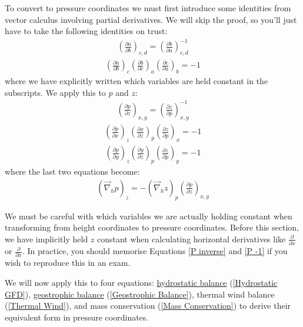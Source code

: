 To convert to pressure coordinates we must first introduce some identities from vector calculus involving partial derivatives. We will skip the proof, so you'll just have to take the following identities on trust:
\begin{align*}
    \left(\frac{\partial a}{\partial b}\right)_{c,d}=\left(\frac{\partial b}{\partial a}\right)_{c,d}^{-1}
\end{align*}
\begin{align*}
    \left(\frac{\partial a}{\partial b}\right)_c
    \left(\frac{\partial b}{\partial c}\right)_a
    \left(\frac{\partial c}{\partial a}\right)_b
    =-1
\end{align*}
where we have explicitly written which variables are held constant in the subscripts. We apply this to $p$ and $z$:
\begin{align}
    \label{P inverse}
    \left(\frac{\partial p}{\partial z}\right)_{x,y}=\left(\frac{\partial z}{\partial p}\right)_{x,y}^{-1}
\end{align}
\begin{align*}
    \left(\frac{\partial p}{\partial x}\right)_z
    \left(\frac{\partial x}{\partial z}\right)_p
    \left(\frac{\partial z}{\partial p}\right)_x
    =-1
\end{align*}
\begin{align*}
    \left(\frac{\partial p}{\partial y}\right)_z
    \left(\frac{\partial y}{\partial z}\right)_p
    \left(\frac{\partial z}{\partial p}\right)_y
    =-1
\end{align*}
where the last two equations become:
\begin{align}
    \label{P -1}
    \left(\vec{\nabla}_h p\right)_z=-\left(\vec{\nabla}_h z\right)_p\left(\frac{\partial p}{\partial z}\right)_{x,y}
\end{align}

We must be careful with which variables we are actually holding constant when transforming from height coordinates to pressure coordinates. Before this section, we have implicitly held $z$ constant when calculating horizontal derivatives like $\frac{\partial}{\partial x}$ or $\frac{\partial}{\partial x}$. In practice, you should memorise Equations \ref{P inverse} and \ref{P -1} if you wish to reproduce this in an exam.

We will now apply this to four equations: \hyperref[Hydrostatic GFD Box]{hydrostatic balance} (\ref{Hydrostatic GFD}), \hyperref[Geostrophic Box]{geostrophic balance} (\ref{Geostrophic Balance}), thermal wind balance (\ref{Thermal Wind}), and mass conservation (\ref{Mass Conservation}) to derive their equivalent form in pressure coordinates. 

